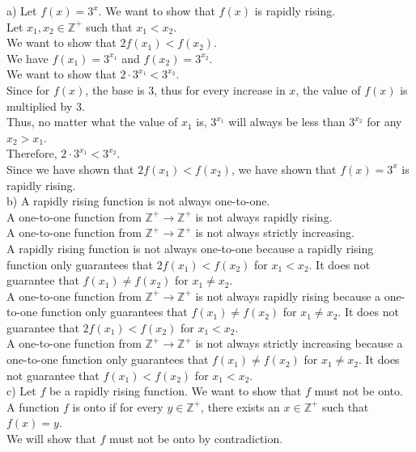 \documentclass[12pt]{exam}
\begin{document}
\begin{solution}
	a) Let $f(x) = 3^x$. We want to show that $f(x)$ is rapidly rising.\\
	Let $x_1, x_2 \in \mathbb{Z}^+$ such that $x_1 < x_2$.\\
	We want to show that $2f(x_1) < f(x_2)$.\\
	We have $f(x_1) = 3^{x_1}$ and $f(x_2) = 3^{x_2}$.\\
	We want to show that $2\cdot 3^{x_1} < 3^{x_2}$.\\
	Since for $f(x)$, the base is 3, thus for every increase in $x$, the value of $f(x)$ is multiplied by 3.\\
	Thus, no matter what the value of $x_1$ is, $3^{x_1}$ will always be less than $3^{x_2}$ for any $x_2 > x_1$.\\
	Therefore, $2\cdot 3^{x_1} < 3^{x_2}$.\\
	Since we have shown that $2f(x_1) < f(x_2)$, we have shown that $f(x) = 3^x$ is rapidly rising.\\
	b) A rapidly rising function is not always one-to-one.\\
	A one-to-one function from $\mathbb{Z}^+\to\mathbb{Z}^+$ is not always rapidly rising.\\
	A one-to-one function from $\mathbb{Z}^+\to\mathbb{Z}^+$ is not always strictly increasing.\\
	A rapidly rising function is not always one-to-one because a rapidly rising function only guarantees that $2f(x_1) < f(x_2)$ for $x_1 < x_2$. It does not guarantee that $f(x_1) \neq f(x_2)$ for $x_1 \neq x_2$.\\
	A one-to-one function from $\mathbb{Z}^+\to\mathbb{Z}^+$ is not always rapidly rising because a one-to-one function only guarantees that $f(x_1) \neq f(x_2)$ for $x_1 \neq x_2$. It does not guarantee that $2f(x_1) < f(x_2)$ for $x_1 < x_2$.\\
	A one-to-one function from $\mathbb{Z}^+\to\mathbb{Z}^+$ is not always strictly increasing because a one-to-one function only guarantees that $f(x_1) \neq f(x_2)$ for $x_1 \neq x_2$. It does not guarantee that $f(x_1) < f(x_2)$ for $x_1 < x_2$.\\
	c) Let $f$ be a rapidly rising function. We want to show that $f$ must not be onto.\\
	A function $f$ is onto if for every $y\in\mathbb{Z}^+$, there exists an $x\in\mathbb{Z}^+$ such that $f(x) = y$.\\
	We will show that $f$ must not be onto by contradiction.\\

\end{solution}
\end{document}
